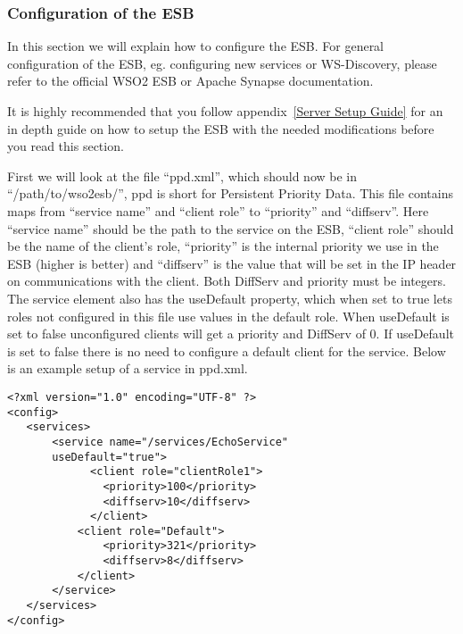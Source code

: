     \subsubsection{Configuration of the ESB}\label{Configuration of the ESB} 
	In this section we will explain how to configure the ESB. For general configuration of the ESB, eg. configuring new services or WS-Discovery, please refer to the official WSO2 ESB or Apache Synapse documentation.

	\begin{shaded}
	It is highly recommended that you follow appendix~\ref{Server Setup Guide} for an in depth guide on how to setup the ESB with the needed modifications before you read this section.
	\end{shaded}

	First we will look at the file “ppd.xml”, which should now be in “/path/to/wso2esb/”, ppd is short for Persistent Priority Data. This file contains maps from “service name” and “client role” to “priority” and “diffserv”. Here “service name” should be the path to the service on the ESB, “client role” should be the name of the client’s role, “priority” is the internal priority we use in the ESB (higher is better) and “diffserv” is the value that will be set in the IP header on communications with the client. Both DiffServ and priority must be integers.
	The service element also has the useDefault property, which when set to true lets roles not configured in this file use values in the default role. When useDefault is set to false unconfigured clients will get a priority and DiffServ of 0. If useDefault is set to false there is no need to configure a default client for the service.
	Below is an example setup of a service in ppd.xml.\\

\lstset{language=XML, style=eclipse}
\lstset{showstringspaces=false}
\begin{lstlisting}[frame=single, caption={ms.xml}, label=ms listing, breaklines=true] %Ok to not have this referenced =)
<?xml version="1.0" encoding="UTF-8" ?>
<config>
   <services>
	   <service name="/services/EchoService" 
	   useDefault="true">
	         <client role="clientRole1">
	           <priority>100</priority>
	           <diffserv>10</diffserv>
	         </client>
	       <client role="Default">
	           <priority>321</priority>
	           <diffserv>8</diffserv>
	       </client>
	   </service>
   </services>
</config>
\end{lstlisting}

